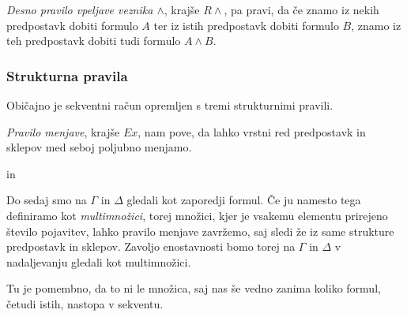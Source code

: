 \begin{definicija} \label{inr}
	\emph{Desno pravilo vpeljave veznika $\land$}, krajše $R\land$, pa pravi, da če znamo iz nekih predpostavk dobiti formulo $A$ ter iz istih predpostavk dobiti formulo $B$, znamo iz teh predpostavk dobiti tudi formulo $A \land B$.
	\begin{prooftree}
    \end{prooftree}
\end{definicija}

\subsubsection{Strukturna pravila}

Običajno je sekventni račun opremljen s tremi strukturnimi pravili.

\begin{definicija}
	\emph{Pravilo menjave}, krajše $Ex$, nam pove, da lahko vrstni red predpostavk in sklepov med seboj poljubno menjamo.
	\begin{center}
        \begin{bprooftree}
        \end{bprooftree}\qquad
        in \qquad
        \begin{bprooftree}
        \end{bprooftree}
	\end{center}
\end{definicija}

\begin{opomba}
	Do sedaj smo na $\Gamma$ in $\Delta$ gledali kot zaporedji formul. Če ju namesto tega definiramo kot \emph{multimnožici}, torej množici, kjer je vsakemu elementu prirejeno število pojavitev, lahko pravilo menjave zavržemo, saj sledi že iz same strukture predpostavk in sklepov. Zavoljo enostavnosti bomo torej na $\Gamma$ in $\Delta$ v nadaljevanju gledali kot multimnožici.

	Tu je pomembno, da to ni le množica, saj nas še vedno zanima koliko formul, četudi istih, nastopa v sekventu.
\end{opomba}

